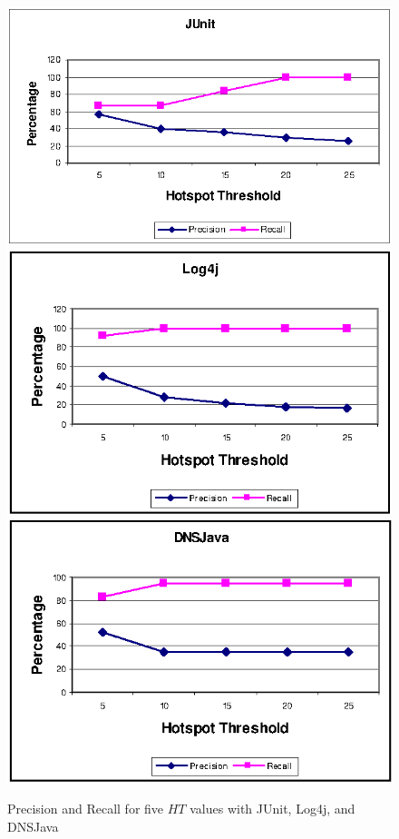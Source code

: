 \documentclass[conference]{IEEEtran}
\begin{document}
\begin{figure}[t]
\centering
\includegraphics[scale=0.72,clip]{junit.eps}
\includegraphics[scale=0.72,clip]{log4j.eps}
\includegraphics[scale=0.72,clip]{dnsjava.eps}
\caption{\label{fig:precrecall}Precision and Recall for five $HT$ values with JUnit, Log4j, and DNSJava} \vspace{-2.5ex}
\end{figure}
\end{document}
